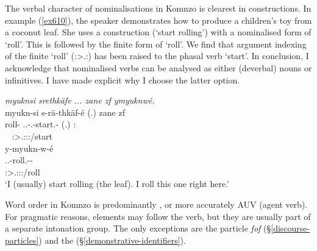 The verbal character of nominalisations in Komnzo is clearest in  constructions. In example (\ref{ex610}), the speaker demonstrates how to produce a children's toy from a coconut leaf. She uses a  construction (`start rolling') with a nominalised form of `roll'. This is followed by the finite form of `roll'. We find that argument indexing of the finite `roll' (\Fsg:\Sbj>\Tsg.\Masc:\Obj) has been raised to the phasal verb `start'. In conclusion, I acknowledge that nominalised verbs can be analysed as either (deverbal) nouns or infinitives. I have made explicit why I choose the latter option.%

\begin{exe}
	\ex \emph{myuknsi srethkäfe ... zane zf ymyuknwé.}\\
	\glll myukn-si s-rä-thkäf-é (.) zane zf\\
	roll-\Nmlz{} \Tsg.\Masc.\Gam-\Irr.\Ndu-start.\Rs-\Fsg{} (.) \Dem:\Prox{} \Imm{} \\
	~ {\Fsg:\Sbj>\Tsg.\Masc:\Obj:\Irr:\Pfv/start} ~ ~ ~ \\
	\sn
	\glll y-myukn-w-é\\
	\Tsg.\Masc.\Alph{}-roll.\Ext-\Ndu-\Fsg{}\\
	\footnotesize{\Fsg:\Sbj>\Tsg.\Masc:\Obj:\Nonpast:\Ipfv/roll}\\
	\trans `I (usually) start rolling (the leaf). I roll this one right here.'\\ 
	\label{ex610}
\end{exe}

Word order in Komnzo is predominantly , or more accurately AUV (agent  verb). For pragmatic reasons, elements may follow the verb, but they are usually part of a separate intonation group. The only exceptions are the  particle \textit{fof} (\S{}\ref{discourse-particles}) and the   (\S{}\ref{demonstrative-identifiers}).%

